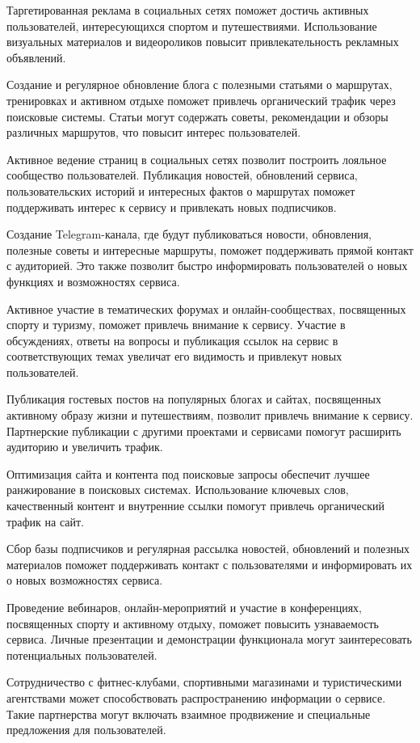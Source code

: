 Таргетированная реклама в социальных сетях поможет достичь активных пользователей, интересующихся спортом и путешествиями. Использование визуальных материалов и видеороликов повысит привлекательность рекламных объявлений.

Создание и регулярное обновление блога с полезными статьями о маршрутах, тренировках и активном отдыхе поможет привлечь органический трафик через поисковые системы. Статьи могут содержать советы, рекомендации и обзоры различных маршрутов, что повысит интерес пользователей.

Активное ведение страниц в социальных сетях позволит построить лояльное сообщество пользователей. Публикация новостей, обновлений сервиса, пользовательских историй и интересных фактов о маршрутах поможет поддерживать интерес к сервису и привлекать новых подписчиков.

Создание Telegram-канала, где будут публиковаться новости, обновления, полезные советы и интересные маршруты, поможет поддерживать прямой контакт с аудиторией. Это также позволит быстро информировать пользователей о новых функциях и возможностях сервиса.

Активное участие в тематических форумах и онлайн-сообществах, посвященных спорту и туризму, поможет привлечь внимание к сервису. Участие в обсуждениях, ответы на вопросы и публикация ссылок на сервис в соответствующих темах увеличат его видимость и привлекут новых пользователей.

Публикация гостевых постов на популярных блогах и сайтах, посвященных активному образу жизни и путешествиям, позволит привлечь внимание к сервису. Партнерские публикации с другими проектами и сервисами помогут расширить аудиторию и увеличить трафик.

Оптимизация сайта и контента под поисковые запросы обеспечит лучшее ранжирование в поисковых системах. Использование ключевых слов, качественный контент и внутренние ссылки помогут привлечь органический трафик на сайт.

Сбор базы подписчиков и регулярная рассылка новостей, обновлений и полезных материалов поможет поддерживать контакт с пользователями и информировать их о новых возможностях сервиса.

Проведение вебинаров, онлайн-мероприятий и участие в конференциях, посвященных спорту и активному отдыху, поможет повысить узнаваемость сервиса. Личные презентации и демонстрации функционала могут заинтересовать потенциальных пользователей.

Сотрудничество с фитнес-клубами, спортивными магазинами и туристическими агентствами может способствовать распространению информации о сервисе. Такие партнерства могут включать взаимное продвижение и специальные предложения для пользователей.


